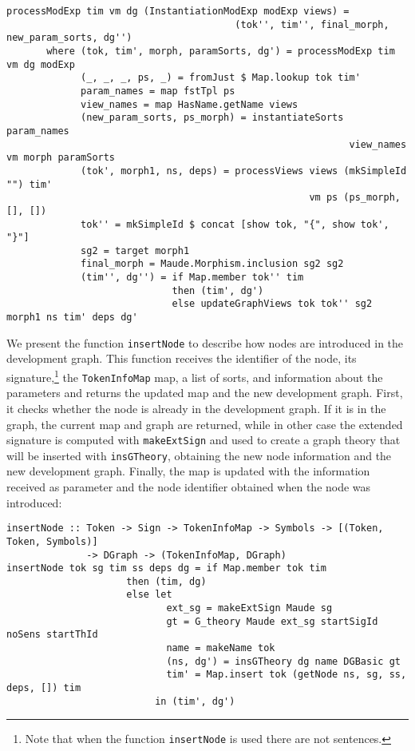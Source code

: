 \begin{itemize}
{\codesize
\begin{verbatim}
processModExp tim vm dg (InstantiationModExp modExp views) = 
                                        (tok'', tim'', final_morph, new_param_sorts, dg'')
       where (tok, tim', morph, paramSorts, dg') = processModExp tim vm dg modExp
             (_, _, _, ps, _) = fromJust $ Map.lookup tok tim'
             param_names = map fstTpl ps
             view_names = map HasName.getName views
             (new_param_sorts, ps_morph) = instantiateSorts param_names 
                                                            view_names vm morph paramSorts
             (tok', morph1, ns, deps) = processViews views (mkSimpleId "") tim' 
                                                     vm ps (ps_morph, [], [])
             tok'' = mkSimpleId $ concat [show tok, "{", show tok', "}"]
             sg2 = target morph1
             final_morph = Maude.Morphism.inclusion sg2 sg2
             (tim'', dg'') = if Map.member tok'' tim
                             then (tim', dg')
                             else updateGraphViews tok tok'' sg2 morph1 ns tim' deps dg'
\end{verbatim}
}

\end{itemize}

We present the function \verb"insertNode" to describe how nodes are
introduced in the development graph. This function receives the
identifier of the node, its signature,\footnote{Note that when the
function \texttt{insertNode} is used there are not sentences.}
the \verb"TokenInfoMap" map, a list of sorts, and information
about the parameters and returns the updated map and the new development
graph. First, it checks whether
the node is already in the development graph. If it is in the graph,
the current map and graph are returned, while in other case the extended
signature is computed with \verb"makeExtSign" and used to create a graph
theory that will be inserted with \verb"insGTheory", obtaining the new
node information and the new development graph. Finally, the map is
updated with the information received as parameter and the node identifier
obtained when the node was introduced:

{\codesize
\begin{verbatim}
insertNode :: Token -> Sign -> TokenInfoMap -> Symbols -> [(Token, Token, Symbols)]
              -> DGraph -> (TokenInfoMap, DGraph)
insertNode tok sg tim ss deps dg = if Map.member tok tim
                     then (tim, dg)
                     else let
                            ext_sg = makeExtSign Maude sg
                            gt = G_theory Maude ext_sg startSigId noSens startThId
                            name = makeName tok
                            (ns, dg') = insGTheory dg name DGBasic gt
                            tim' = Map.insert tok (getNode ns, sg, ss, deps, []) tim
                          in (tim', dg')
\end{verbatim}
}


